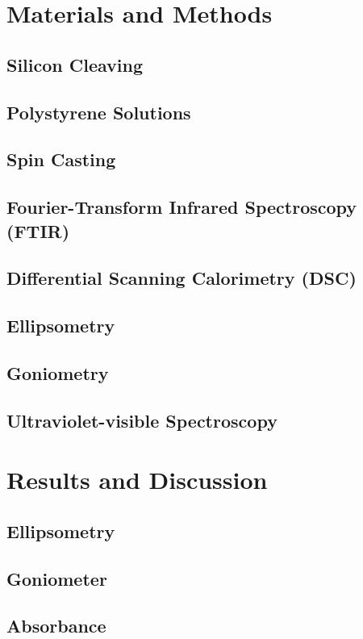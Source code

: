 \documentclass{article}
\begin{document}
\begin{multicols}{2}
        \section{Materials and Methods}
            \subsection{Silicon Cleaving}
            \subsection{Polystyrene Solutions}
            \subsection{Spin Casting}
            \subsection{Fourier-Transform Infrared Spectroscopy (FTIR)}
            \subsection{Differential Scanning Calorimetry (DSC)}
            \subsection{Ellipsometry}
            \subsection{Goniometry}
            \subsection{Ultraviolet-visible Spectroscopy}
        \section{Results and Discussion}
            \subsection{Ellipsometry}
            \subsection{Goniometer}
            \subsection{Absorbance}

\end{multicols}
\end{document}
